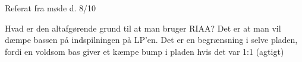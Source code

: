 Referat fra møde d. 8/10

Hvad er den altafgørende grund til at man bruger RIAA? Det er at man vil dæmpe bassen på indspilningen på LP'en. Det er en begrænsning i selve pladen, fordi en voldsom bas giver et kæmpe bump i pladen hvis det var 1:1 (agtigt)

